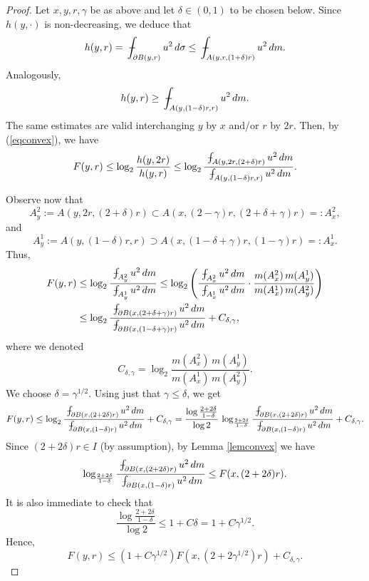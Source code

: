 \documentclass[11pt]{amsart}
\newcommand{\rf}[1]{{(\ref{#1})}}
\def\Xint#1{\mathchoice
{\XXint\displaystyle\textstyle{#1}}%
{\XXint\textstyle\scriptstyle{#1}}%
{\XXint\scriptstyle\scriptscriptstyle{#1}}%
{\XXint\scriptscriptstyle\scriptscriptstyle{#1}}%
\!\int}
\def\XXint#1#2#3{{\setbox0=\hbox{$#1{#2#3}{\int}$ }
\vcenter{\hbox{$#2#3$ }}\kern-.58\wd0}}
\def\avint{\;\Xint-}
\theoremstyle{definition}
\theoremstyle{remark}
\numberwithin{equation}{section}
\begin{document}
\begin{proof}
Let $x,y,r,\gamma$ be as above and let $\delta\in (0,1)$ to be chosen below. Since $h(y,\cdot)$ is non-decreasing, we deduce that
$$h(y,r)= \avint_{\partial B(y,r)} u^2\,d\sigma\leq \avint_{A(y,r,(1+\delta) r)} u^2\,dm.$$
Analogously,
$$h(y,r)\geq  \avint_{A(y,(1-\delta) r,r)} u^2\,dm.$$
The same estimates are valid interchanging $y$ by $x$ and/or $r$ by $2r$.
Then, by \rf{eqconvex}, we have
$$F(y,r) \leq \log_2\frac{h(y,2r)}{h(y,r)} \leq 
\log_2\frac{\avint_{A(y,2r,(2+\delta) r)} u^2\,dm}{\avint_{A(y,(1-\delta) r,r)} u^2\,dm}.$$

Observe now that
$$A_y^2 := A(y,2r,(2+\delta) r) \subset A(x,(2-\gamma)r,(2+\delta+\gamma) r) =: A_x^2,$$
and
$$A_y^1 := A(y,(1-\delta) r,r) \supset A(x,(1-\delta+\gamma) r,(1-\gamma)r) =: A_x^1.$$
Thus,
\begin{align*}
F(y,r) & \leq 
\log_2\frac{\avint_{A_y^2} u^2\,dm}{ \avint_{A_y^1} u^2\,dm} \leq
\log_2\left( \frac{\avint_{A_x^2} u^2\,dm}{\avint_{A_x^1} u^2\,dm}\cdot
\frac{m(A_x^2)\,m(A_y^1)}{m(A_x^1)\,m(A_y^2)}\right)\\
& \leq \log_2 \frac{\avint_{\partial B(x,(2+\delta+\gamma) r) } u^2\,dm}{\avint_{\partial B(x,(1-\delta+\gamma) r)} u^2\,dm} + C_{\delta,\gamma},
\end{align*}
where we denoted 
$$C_{\delta,\gamma} = \log_2 \frac{m(A_x^2)\,m(A_y^1)}{m(A_x^1)\,m(A_y^2)}.$$
We choose $\delta=\gamma^{1/2}$. Using just that $\gamma\leq\delta$, we get
$$F(y,r) \leq \log_2 \frac{\avint_{\partial B(x,(2+2\delta) r) } u^2\,dm}{\avint_{\partial B(x,(1-\delta) r)} u^2\,dm} + C_{\delta,\gamma} = \frac{\log \frac{2+2\delta}{1-\delta}}{\log 2}\,
\log_{\frac{2+2\delta}{1-\delta}} \frac{\avint_{\partial B(x,(2+2\delta) r) } u^2\,dm}{\avint_{\partial B(x,(1-\delta) r)} u^2\,dm} + C_{\delta,\gamma}
.$$
Since $(2+2\delta)r\in I$ (by assumption), by Lemma \ref{lemconvex} we have
$$\log_{\frac{2+2\delta}{1-\delta}} \frac{\avint_{\partial B(x,(2+2\delta) r) } u^2\,dm}{\avint_{\partial B(x,(1-\delta) r)} u^2\,dm}\leq F(x,(2+2\delta) r).$$
It is also immediate to check that
$$\frac{\log \frac{2+2\delta}{1-\delta}}{\log 2} \leq 1 + C\delta = 1+ C\gamma^{1/2}.$$
Hence,
$$F(y,r) \leq (1+ C\gamma^{1/2}) F(x,(2+2\gamma^{1/2}) r) + C_{\delta,\gamma}.$$


\end{proof}
\end{document}

